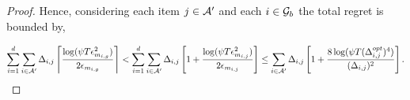 \begin{proof}
Hence, considering each item $j\in\mathcal{A}'$ and each $i\in\mathcal{G}_b$ the total regret is bounded by,

\begin{align*}
\sum_{i=1}^{d}\sum_{i\in\mathcal{A}'}\Delta_{i,j}\left\lceil \dfrac{\log(\psi T\epsilon_{m_{i,g}}^2)}{2\epsilon_{m_{i,g}}} \right\rceil < \sum_{i=1}^{d}\sum_{i\in\mathcal{A}'}\Delta_{i,j}\left[ 1 + \dfrac{\log(\psi T\epsilon_{m_{i,j}}^2)}{2\epsilon_{m_{i,j}}} \right] \leq \sum_{i\in\mathcal{A}'}\Delta_{i,j}\left[ 1 + \dfrac{8\log(\psi T(\Delta^{opt}_{i,j})^4)}{(\Delta_{i,j})^2}\right].
\end{align*} 


%
%

\end{proof}